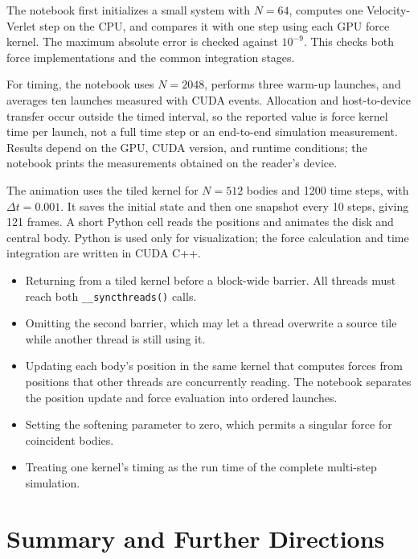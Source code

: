 The notebook first initializes a small system with $N=64$, computes one
Velocity-Verlet step on the CPU, and compares it with one step using each GPU
force kernel. The maximum absolute error is checked against $10^{-9}$. This
checks both force implementations and the common integration stages.

For timing, the notebook uses $N=2048$, performs three warm-up launches, and
averages ten launches measured with CUDA events. Allocation and host-to-device
transfer occur outside the timed interval, so the reported value is force
kernel time per launch, not a full time step or an end-to-end simulation
measurement. Results depend on the GPU, CUDA version, and runtime conditions;
the notebook prints the measurements obtained on the reader's device.

The animation uses the tiled kernel for $N=512$ bodies and 1200 time steps,
with $\Delta t=0.001$. It saves the initial state and then one snapshot every
10 steps, giving 121 frames. A short Python cell reads the positions and
animates the disk and central body. Python is used only for visualization;
the force calculation and time integration are written in CUDA C++.

\begin{validationbox}
\begin{itemize}
    \item Returning from a tiled kernel before a block-wide barrier. All
          threads must reach both \lstinline|__syncthreads()| calls.
    \item Omitting the second barrier, which may let a thread overwrite a
          source tile while another thread is still using it.
    \item Updating each body's position in the same kernel that computes
          forces from positions that other threads are concurrently reading.
          The notebook separates the position update and force evaluation
          into ordered launches.
    \item Setting the softening parameter to zero, which permits a singular
          force for coincident bodies.
    \item Treating one kernel's timing as the run time of the complete
          multi-step simulation.
\end{itemize}
\end{validationbox}

\section{Summary and Further Directions}
\label{sec:nbody-summary}

